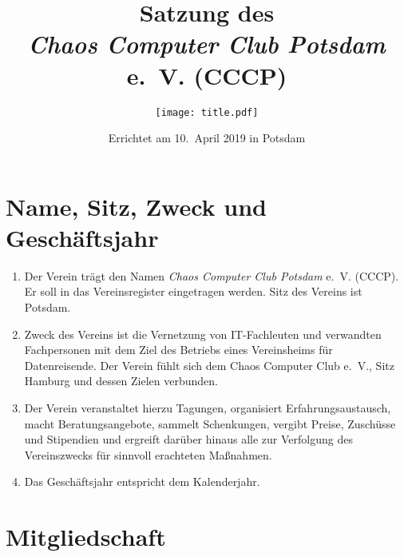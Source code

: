 \documentclass[a4paper, 10pt, headings=normal]{scrartcl}
\title{Satzung des \\ \emph{Chaos Computer Club Potsdam} e.~V. (CCCP)}
\author{\texttt{[image: title.pdf]}}
\date{Errichtet am 10.~April 2019 in Potsdam}
\begin{document}
\maketitle
\pagestyle{myheadings}

\begin{multicols}{2}

\section{Name, Sitz, Zweck und Geschäftsjahr}
\label{par:name-sitz-zweck}

\begin{enumerate}[label={(\arabic*)}]
	\item
		Der Verein trägt den Namen \emph{Chaos Computer Club Potsdam} e.~V. (CCCP).
		Er soll in das Vereinsregister eingetragen werden.
		Sitz des Vereins ist Potsdam.
	\item
		Zweck des Vereins ist die Vernetzung von IT-Fachleuten und verwandten Fachpersonen mit dem Ziel des Betriebs eines Vereinsheims für Datenreisende.
		Der Verein fühlt sich dem Chaos Computer Club e.~V., Sitz Hamburg und dessen Zielen verbunden.
	\item
		Der Verein veranstaltet hierzu Tagungen, organisiert Erfahrungsaustausch, macht Beratungsangebote, sammelt Schenkungen, vergibt Preise, Zuschüsse und Stipendien und ergreift darüber hinaus alle zur Verfolgung des Vereinszwecks für sinnvoll erachteten Maßnahmen.
	\item
		Das Geschäftsjahr entspricht dem Kalenderjahr.
\end{enumerate}

\section{Mitgliedschaft}
\label{par:mitgliedschaft}


\end{multicols}
\end{document}
